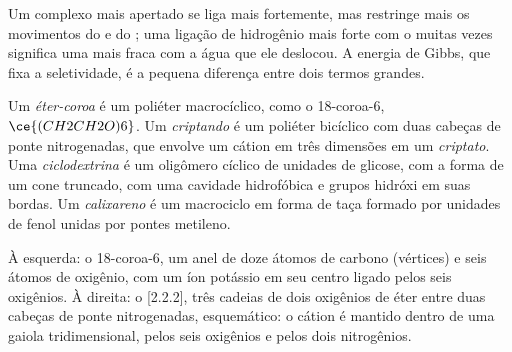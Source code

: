 Um complexo mais apertado se liga mais fortemente, mas restringe mais os movimentos do  e
do ; uma ligação de hidrogênio mais forte com o  muitas vezes significa uma mais fraca com
a água que ele deslocou. A energia de Gibbs, que fixa a seletividade, é a pequena
diferença entre dois termos grandes.

\begin{definition}[Hospedeiros]\label{def:b3:supramolecular:hosts}
Um \emph{éter-coroa} é um poliéter macrocíclico, como o
18-coroa-6, $\ce{(CH2CH2O)6}$. Um \emph{criptando} é um poliéter
bicíclico com duas cabeças de ponte nitrogenadas, que envolve um cátion em três
dimensões em um \emph{criptato}. Uma
\emph{ciclodextrina} é um oligômero cíclico de unidades de glicose, com
a forma de um cone truncado, com uma cavidade hidrofóbica e grupos hidróxi em
suas bordas. Um \emph{calixareno} é um macrociclo em forma de taça formado por
unidades de fenol unidas por pontes metileno.
\end{definition}

\begin{omfigure}

{\small À esquerda: o 18-coroa-6, um anel de doze átomos de carbono (vértices) e seis átomos de
oxigênio, com um íon potássio em seu centro ligado pelos seis oxigênios. À direita: o
[2.2.2], três cadeias de dois oxigênios de éter entre duas cabeças de ponte
nitrogenadas, esquemático: o cátion é mantido dentro de uma gaiola tridimensional,
pelos seis oxigênios e pelos dois nitrogênios.}
\end{omfigure}

